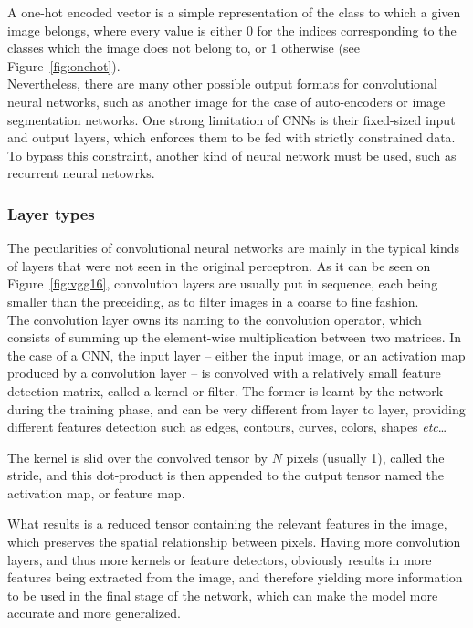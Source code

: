 A one-hot encoded vector is a simple representation of the class to which a
given image belongs, where every value is either 0 for the indices corresponding
to the classes which the image does not belong to, or 1 otherwise (see
Figure~\ref{fig:onehot}).\\

Nevertheless, there are many other possible output formats for convolutional
neural networks, such as another image for the case of auto-encoders or image
segmentation networks. One strong limitation of CNNs is their fixed-sized
input and output layers, which enforces them to be fed with strictly
constrained data. To bypass this constraint, another kind of neural network
must be used, such as recurrent neural netowrks.

	\subsubsection{Layer types}

The pecularities of convolutional neural networks are mainly in the typical
kinds of layers that were not seen in the original perceptron. As it can be seen
on Figure~\ref{fig:vgg16}, convolution layers are usually put in sequence, each
being smaller than the preceiding, as to filter images in a coarse to fine
fashion.\\

The convolution layer owns its naming to the convolution operator, which
consists of summing up the element-wise multiplication between two matrices. In
the case of a CNN, the input layer -- either the input image, or an activation
map produced by a convolution layer -- is convolved with a relatively small
feature detection matrix, called a kernel or filter. The former is learnt by the
network during the training phase, and can be very different from layer to
layer, providing different features detection such as edges, contours, curves,
colors, shapes \emph{etc}\ldots

The kernel is slid over the convolved tensor by $N$ pixels (usually 1), called
the stride, and this dot-product is then appended to the output tensor named
the activation map, or feature map.

What results is a reduced tensor containing the relevant features in the image,
which preserves the spatial relationship between pixels. Having more convolution
layers, and thus more kernels or feature detectors, obviously results in more
features being extracted from the image, and therefore yielding more information
to be used in the final stage of the network, which can make the model more
accurate and more generalized.

